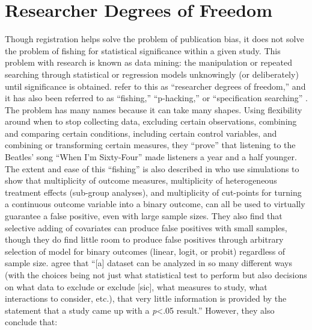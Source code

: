 \documentclass[12pt] {article}
\begin{document}
\section{Researcher Degrees of
Freedom}\label{rdof}

Though registration helps solve the problem of publication bias, it does
not solve the problem of fishing for statistical significance within a
given study. This problem with research is known as data mining: the manipulation or repeated searching through statistical or regression
models unknowingly (or deliberately) until significance is obtained.
 \cite{simmons_false-positive_2011} refer to this as
``researcher degrees of freedom,'' and it has also been referred to as
``fishing,'' ``p-hacking,'' or ``specification searching'' \citep{humphreys_fishing_2013}. The problem has many names because it can take many shapes. Using flexibility around when to stop
collecting data, excluding certain observations, combining and comparing
certain conditions, including certain control variables, and combining
or transforming certain measures, they ``prove'' that listening to the
Beatles' song ``When I'm Sixty-Four'' made listeners a year and a half
younger. The extent and ease of this ``fishing'' is also described in
\cite{humphreys_fishing_2013} who use simulations to show that multiplicity of outcome measures, multiplicity of heterogeneous treatment effects (sub-group analyses), and multiplicity of cut-points for turning a continuous outcome variable into a binary outcome, can all be used to virtually guarantee a false positive, even with large sample sizes. They also find that selective adding of covariates can produce false positives with small samples, though they do find little room to produce false positives through arbitrary selection of model for binary outcomes (linear, logit, or probit) regardless of sample size. \cite{gelman_garden_2013} agree that
``{[}a{]} dataset can be analyzed in so many different ways (with the
choices being not just what statistical test to perform but also
decisions on what data to exclude or exclude {[}sic{]}, what measures to
study, what interactions to consider, etc.), that very little
information is provided by the statement that a study came up with a
\emph{p}\textless{}.05 result.'' However, they also conclude that:
\end{document}
